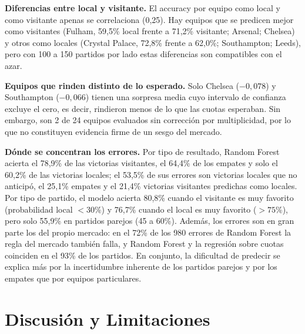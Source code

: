 \documentclass{ieeeaccess}
\begin{document}
\textbf{Diferencias entre local y visitante.} El accuracy por equipo como local y como visitante apenas se correlaciona (0,25). Hay equipos que se predicen mejor como visitantes (Fulham, 59,5\% local frente a 71,2\% visitante; Arsenal; Chelsea) y otros como locales (Crystal Palace, 72,8\% frente a 62,0\%; Southampton; Leeds), pero con 100 a 150 partidos por lado estas diferencias son compatibles con el azar.

\textbf{Equipos que rinden distinto de lo esperado.} Solo Chelsea ($-0{,}078$) y Southampton ($-0{,}066$) tienen una sorpresa media cuyo intervalo de confianza excluye el cero, es decir, rindieron menos de lo que las cuotas esperaban. Sin embargo, son 2 de 24 equipos evaluados sin corrección por multiplicidad, por lo que no constituyen evidencia firme de un sesgo del mercado.

\textbf{Dónde se concentran los errores.} Por tipo de resultado, Random Forest acierta el 78,9\% de las victorias visitantes, el 64,4\% de los empates y solo el 60,2\% de las victorias locales; el 53,5\% de sus errores son victorias locales que no anticipó, el 25,1\% empates y el 21,4\% victorias visitantes predichas como locales. Por tipo de partido, el modelo acierta 80,8\% cuando el visitante es muy favorito (probabilidad local $<30\%$) y 76,7\% cuando el local es muy favorito ($>75\%$), pero solo 55,9\% en partidos parejos (45 a 60\%). Además, los errores son en gran parte los del propio mercado: en el 72\% de los 980 errores de Random Forest la regla del mercado también falla, y Random Forest y la regresión sobre cuotas coinciden en el 93\% de los partidos. En conjunto, la dificultad de predecir se explica más por la incertidumbre inherente de los partidos parejos y por los empates que por equipos particulares.

\section{Discusión y Limitaciones}
\label{sec:discusion}
\end{document}

